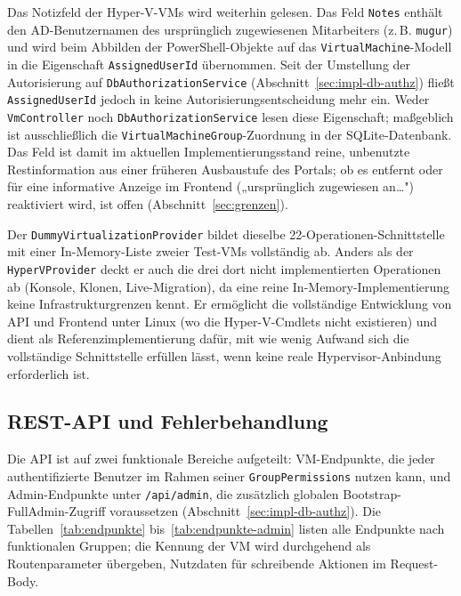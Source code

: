 \documentclass[12pt,a4paper]{article}
\begin{document}
Das Notizfeld der Hyper-V-VMs wird weiterhin gelesen. Das Feld \texttt{Notes} enthält den AD-Benutzernamen des ursprünglich zugewiesenen Mitarbeiters (z.\,B. \texttt{mugur}) und wird beim Abbilden der PowerShell-Objekte auf das \texttt{VirtualMachine}-Modell in die Eigenschaft \texttt{AssignedUserId} übernommen. Seit der Umstellung der Autorisierung auf \texttt{DbAuthorizationService} (Abschnitt~\ref{sec:impl-db-authz}) fließt \texttt{AssignedUserId} jedoch in keine Autorisierungsentscheidung mehr ein. Weder \texttt{VmController} noch \texttt{DbAuthorizationService} lesen diese Eigenschaft; maßgeblich ist ausschließlich die \texttt{VirtualMachineGroup}-Zuordnung in der SQLite-Datenbank. Das Feld ist damit im aktuellen Implementierungsstand reine, unbenutzte Restinformation aus einer früheren Ausbaustufe des Portals; ob es entfernt oder für eine informative Anzeige im Frontend („ursprünglich zugewiesen an…") reaktiviert wird, ist offen (Abschnitt~\ref{sec:grenzen}).

Der \texttt{DummyVirtualizationProvider} bildet dieselbe 22-Operationen-Schnittstelle mit einer In-Memory-Liste zweier Test-VMs vollständig ab. Anders als der \texttt{HyperVProvider} deckt er auch die drei dort nicht implementierten Operationen ab (Konsole, Klonen, Live-Migration), da eine reine In-Memory-Implementierung keine Infrastrukturgrenzen kennt. Er ermöglicht die vollständige Entwicklung von API und Frontend unter Linux (wo die Hyper-V-Cmdlets nicht existieren) und dient als Referenzimplementierung dafür, mit wie wenig Aufwand sich die vollständige Schnittstelle erfüllen lässt, wenn keine reale Hypervisor-Anbindung erforderlich ist.

\subsection{REST-API und Fehlerbehandlung}
\label{sec:impl-api}

Die API ist auf zwei funktionale Bereiche aufgeteilt: VM-Endpunkte, die jeder authentifizierte Benutzer im Rahmen seiner \texttt{GroupPermissions} nutzen kann, und Admin-Endpunkte unter \texttt{/api/admin}, die zusätzlich globalen Bootstrap-FullAdmin-Zugriff voraussetzen (Abschnitt~\ref{sec:impl-db-authz}). Die Tabellen~\ref{tab:endpunkte} bis~\ref{tab:endpunkte-admin} listen alle Endpunkte nach funktionalen Gruppen; die Kennung der VM wird durchgehend als Routenparameter übergeben, Nutzdaten für schreibende Aktionen im Request-Body.
\end{document}
